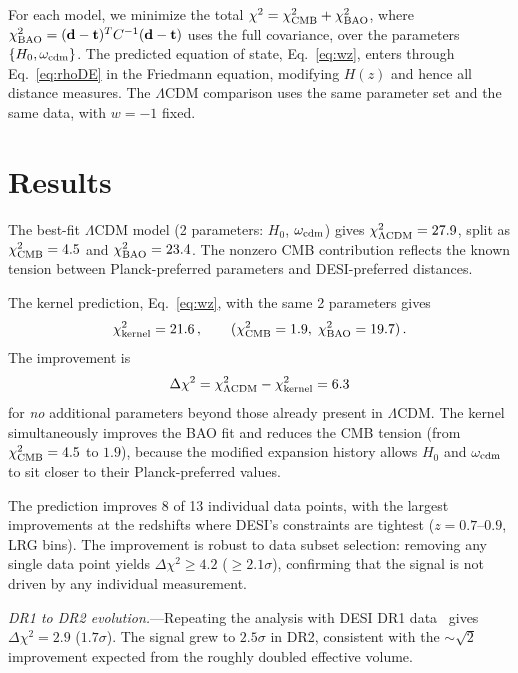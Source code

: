 \documentclass[aps,prl,twocolumn,showpacs,preprintnumbers,amsmath,amssymb,superscriptaddress]{revtex4-2}
\begin{document}
For each model, we minimize the total 
$\chi^2 = \chi^2_{\rm CMB} + \chi^2_{\rm BAO}$, where 
$\chi^2_{\rm BAO} = (\mathbf{d}-\mathbf{t})^T C^{-1}(\mathbf{d}-\mathbf{t})$ 
uses the full covariance, over the parameters $\{H_0, \omega_{\rm cdm}\}$. 
The predicted equation of state, Eq.~\eqref{eq:wz}, enters through 
Eq.~\eqref{eq:rhoDE} in the Friedmann equation, modifying $H(z)$ and 
hence all distance measures. The $\Lambda$CDM comparison uses the same 
parameter set and the same data, with $w=-1$ fixed.

\section{Results}

The best-fit $\Lambda$CDM model (2 parameters: $H_0$, $\omega_{\rm cdm}$) 
gives $\chi^2_{\Lambda\rm CDM} = 27.9$, split as 
$\chi^2_{\rm CMB} = 4.5$ and $\chi^2_{\rm BAO} = 23.4$. The nonzero 
CMB contribution reflects the known tension between Planck-preferred 
parameters and DESI-preferred distances.

The kernel prediction, Eq.~\eqref{eq:wz}, with the same 2 parameters 
gives
\begin{equation}
\chi^2_{\rm kernel} = 21.6\,,\qquad 
(\chi^2_{\rm CMB} = 1.9,\;\chi^2_{\rm BAO} = 19.7)\,.
\label{eq:chi2}
\end{equation}
The improvement is
\begin{equation}
\Delta\chi^2 = \chi^2_{\Lambda\rm CDM} - \chi^2_{\rm kernel} = 6.3
\label{eq:dchi2}
\end{equation}
for \emph{no} additional parameters beyond those already present 
in $\Lambda$CDM. The kernel simultaneously 
improves the BAO fit and reduces the CMB tension (from 
$\chi^2_{\rm CMB} = 4.5$ to $1.9$), because the modified expansion 
history allows $H_0$ and $\omega_{\rm cdm}$ to sit closer to their 
Planck-preferred values.

The prediction improves 8 of 13 individual data points, with the 
largest improvements at the redshifts where DESI's constraints are 
tightest ($z = 0.7$--$0.9$, LRG bins). The improvement is robust to 
data subset selection: removing any single data point yields 
$\Delta\chi^2 \geq 4.2$ ($\geq 2.1\sigma$), confirming that the 
signal is not driven by any individual measurement.

\textit{DR1 to DR2 evolution.}---Repeating the analysis with DESI 
DR1 data~\cite{DESI_DR1} gives $\Delta\chi^2 = 2.9$ ($1.7\sigma$). 
The signal grew to $2.5\sigma$ in DR2, consistent with the 
$\sim\!\sqrt{2}$ improvement expected from the roughly doubled 
effective volume.
\end{document}
